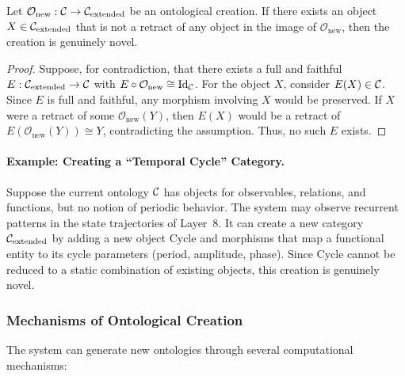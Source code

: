 \begin{theorem}
\label{thm:irreducibility}
Let $\mathcal{O}_{\text{new}}: \mathcal{C} \to \mathcal{C}_{\text{extended}}$ be an ontological creation. If there exists an object $X \in \mathcal{C}_{\text{extended}}$ that is not a retract of any object in the image of $\mathcal{O}_{\text{new}}$, then the creation is genuinely novel.
\end{theorem}
\begin{proof}
Suppose, for contradiction, that there exists a full and faithful $E: \mathcal{C}_{\text{extended}} \to \mathcal{C}$ with $E \circ \mathcal{O}_{\text{new}} \cong \text{Id}_{\mathcal{C}}$. For the object $X$, consider $E(X) \in \mathcal{C}$. Since $E$ is full and faithful, any morphism involving $X$ would be preserved. If $X$ were a retract of some $\mathcal{O}_{\text{new}}(Y)$, then $E(X)$ would be a retract of $E(\mathcal{O}_{\text{new}}(Y)) \cong Y$, contradicting the assumption. Thus, no such $E$ exists.
\end{proof}

\paragraph{Example: Creating a ``Temporal Cycle'' Category.}
Suppose the current ontology $\mathcal{C}$ has objects for observables, relations, and functions, but no notion of periodic behavior. The system may observe recurrent patterns in the state trajectories of Layer~8. It can create a new category $\mathcal{C}_{\text{extended}}$ by adding a new object $\text{Cycle}$ and morphisms that map a functional entity to its cycle parameters (period, amplitude, phase). Since $\text{Cycle}$ cannot be reduced to a static combination of existing objects, this creation is genuinely novel.

\subsubsection{Mechanisms of Ontological Creation}
The system can generate new ontologies through several computational mechanisms:

